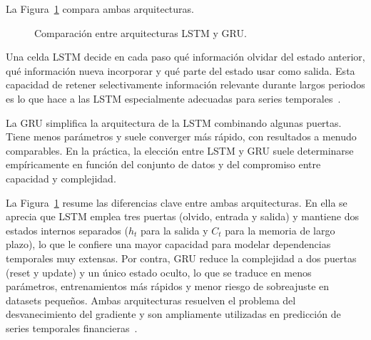 La Figura~\ref{fig:lstm_vs_gru} compara ambas arquitecturas.

\begin{figure}[H]
\centering
{}
\caption{Comparación entre arquitecturas LSTM y GRU.}
\label{fig:lstm_vs_gru}
\end{figure}

Una celda LSTM decide en cada paso qué información olvidar del estado anterior, qué información nueva incorporar y qué parte del estado usar como salida. Esta capacidad de retener selectivamente información relevante durante largos periodos es lo que hace a las LSTM especialmente adecuadas para series temporales~\cite{fischer2018deep}.

La GRU simplifica la arquitectura de la LSTM combinando algunas puertas. Tiene menos parámetros y suele converger más rápido, con resultados a menudo comparables. En la práctica, la elección entre LSTM y GRU suele determinarse empíricamente en función del conjunto de datos y del compromiso entre capacidad y complejidad.

La Figura~\ref{fig:lstm_vs_gru} resume las diferencias clave entre ambas arquitecturas. En ella se aprecia que LSTM emplea tres puertas (olvido, entrada y salida) y mantiene dos estados internos separados ($h_t$ para la salida y $C_t$ para la memoria de largo plazo), lo que le confiere una mayor capacidad para modelar dependencias temporales muy extensas. Por contra, GRU reduce la complejidad a dos puertas (reset y update) y un único estado oculto, lo que se traduce en menos parámetros, entrenamientos más rápidos y menor riesgo de sobreajuste en datasets pequeños. Ambas arquitecturas resuelven el problema del desvanecimiento del gradiente y son ampliamente utilizadas en predicción de series temporales financieras~\cite{fischer2018deep}.

